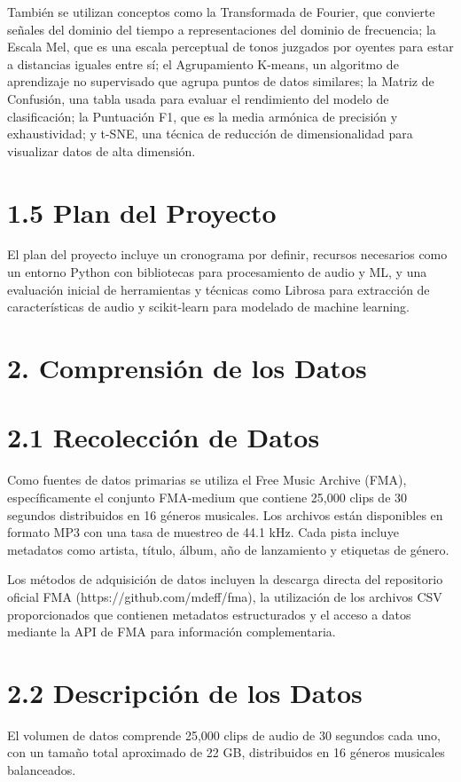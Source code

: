\documentclass{article}
\begin{document}
También se utilizan conceptos como la Transformada de Fourier, que convierte señales del dominio del tiempo a representaciones del dominio de frecuencia; la Escala Mel, que es una escala perceptual de tonos juzgados por oyentes para estar a distancias iguales entre sí; el Agrupamiento K-means, un algoritmo de aprendizaje no supervisado que agrupa puntos de datos similares; la Matriz de Confusión, una tabla usada para evaluar el rendimiento del modelo de clasificación; la Puntuación F1, que es la media armónica de precisión y exhaustividad; y t-SNE, una técnica de reducción de dimensionalidad para visualizar datos de alta dimensión.

\section*{1.5 Plan del Proyecto}
El plan del proyecto incluye un cronograma por definir, recursos necesarios como un entorno Python con bibliotecas para procesamiento de audio y ML, y una evaluación inicial de herramientas y técnicas como Librosa para extracción de características de audio y scikit-learn para modelado de machine learning.

\section*{2. Comprensión de los Datos}

\section*{2.1 Recolección de Datos}
Como fuentes de datos primarias se utiliza el Free Music Archive (FMA), específicamente el conjunto FMA-medium que contiene 25,000 clips de 30 segundos distribuidos en 16 géneros musicales. Los archivos están disponibles en formato MP3 con una tasa de muestreo de 44.1 kHz. Cada pista incluye metadatos como artista, título, álbum, año de lanzamiento y etiquetas de género.

Los métodos de adquisición de datos incluyen la descarga directa del repositorio oficial FMA (https://github.com/mdeff/fma), la utilización de los archivos CSV proporcionados que contienen metadatos estructurados y el acceso a datos mediante la API de FMA para información complementaria.

\section*{2.2 Descripción de los Datos}
El volumen de datos comprende 25,000 clips de audio de 30 segundos cada uno, con un tamaño total aproximado de 22 GB, distribuidos en 16 géneros musicales balanceados.
\end{document}
